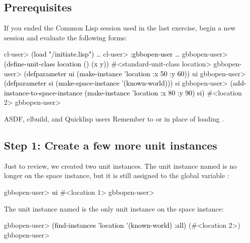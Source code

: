 \documentclass[10pt,twoside,english,pdftex]{article}
\begin{document}
\fndocrule

\subsection*{Prerequisites}

%
%
%
If you ended the Common Lisp session used in the last exercise, begin a new
session and evaluate the following forms:
%
\W\supp
\begin{example}
\textcolor{darkergray}{%
  cl-user> \textcolor{black}{(load "/initiate.lisp")}
     \textrm{\ldots{}}
  cl-user> \textcolor{black}{:gbbopen-user}
     \textrm{\ldots{}}
  gbbopen-user> \textcolor{black}{(define-unit-class location ()
                   (x y))}
  #<standard-unit-class location>
  gbbopen-user> \textcolor{black}{(defparameter ui (make-instance 'location :x 50 :y 60))}
  ui
  gbbopen-user> \textcolor{black}{(defparameter si (make-space-instance '(known-world)))}
  si
  gbbopen-user> \textcolor{black}{(add-instance-to-space-instance 
                   (make-instance 'location :x 80 :y 90)
                   si)}
  #<location 2>
  gbbopen-user>}
\end{example}

%
%
\begin{notebox}{ASDF, clbuild, and Quicklisp users}
  Remember to  or
   in place of loading
  .
\end{notebox}

\subsection*{Step 1: Create a few more unit instances}

Just to review, we created two  unit instances.  The
unit instance named  is no longer on the 
space instance, but it is still assigned to the global variable :
%
%
\W\supp
\begin{example}
\textcolor{darkergray}{%
  gbbopen-user> \textcolor{black}{ui}
  #<location 1> 
  gbbopen-user>}
\end{example}
%
The  unit instance named  is the only
 unit instance on the  space
instance:
%
%
\W\supp\notpretop
\begin{example}
\textcolor{darkergray}{%
  gbbopen-user> \textcolor{black}{(find-instances 'location '(known-world) :all)}
  (#<location 2>)
  gbbopen-user>}
\end{example}
\end{document}
